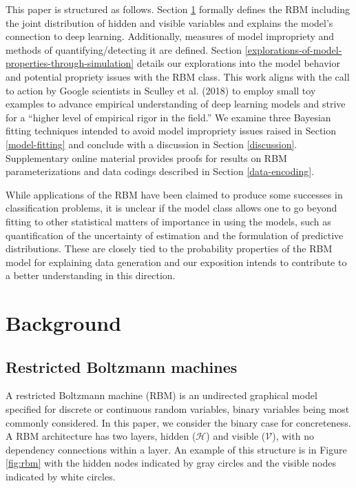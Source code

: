 \documentclass[AMS,STIX1COL]{WileyNJD-v2}
\begin{document}
This paper is structured as follows. Section \ref{background} formally
defines the RBM including the joint distribution of hidden and visible
variables and explains the model's connection to deep learning.
Additionally, measures of model impropriety and methods of
quantifying/detecting it are defined. Section
\ref{explorations-of-model-properties-through-simulation} details our
explorations into the model behavior and potential propriety issues with
the RBM class. This work aligns with the call to action by Google
scientists in Sculley et al. (2018) to employ small toy examples to
advance empirical understanding of deep learning models and strive for a
``higher level of empirical rigor in the field.'' We examine three
Bayesian fitting techniques intended to avoid model impropriety issues
raised in Section \ref{model-fitting} and conclude with a discussion in
Section \ref{discussion}. Supplementary online material provides proofs
for results on RBM parameterizations and data codings described in
Section \ref{data-encoding}.

While applications of the RBM have been claimed to produce some
successes in classification problems, it is unclear if the model class
allows one to go beyond fitting to other statistical matters of
importance in using the models, such as quantification of the
uncertainty of estimation and the formulation of predictive
distributions. These are closely tied to the probability properties of
the RBM model for explaining data generation and our exposition intends
to contribute to a better understanding in this direction.

\hypertarget{background}{%
\section{Background}\label{background}}

\hypertarget{restricted-boltzmann-machines}{%
\subsection{Restricted Boltzmann
machines}\label{restricted-boltzmann-machines}}

A restricted Boltzmann machine (RBM) is an undirected graphical model
specified for discrete or continuous random variables, binary variables
being most commonly considered. In this paper, we consider the binary
case for concreteness. A RBM architecture has two layers, hidden
(\(\mathcal{H}\)) and visible (\(\mathcal{V}\)), with no dependency
connections within a layer. An example of this structure is in Figure
\ref{fig:rbm} with the hidden nodes indicated by gray circles and the
visible nodes indicated by white circles.
\end{document}
